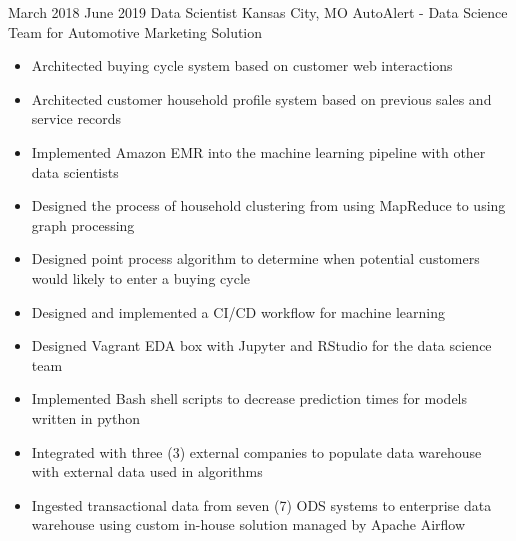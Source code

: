 \ProjectExperience
{March 2018}
{June 2019}
{Data Scientist}
{Kansas City, MO}
{AutoAlert - Data Science Team for Automotive Marketing Solution}
{
    \begin{itemize}
        \item Architected buying cycle system based on customer web interactions
        \item Architected customer household profile system based on previous
        sales and service records
        \item Implemented Amazon EMR into the machine learning pipeline with
        other data scientists
    \end{itemize}
}
{
    \begin{itemize}
        \item Designed the process of household clustering from using MapReduce
        to using graph processing
        \item Designed point process algorithm to determine when potential
        customers would likely to enter a buying cycle
        \item Designed and implemented a CI/CD workflow for machine learning
        \item Designed Vagrant EDA box with Jupyter and RStudio for the data
        science team
    \end{itemize}
}
{
    \begin{itemize}
        \item Implemented Bash shell scripts to decrease prediction times for
        models written in python
        \item Integrated with three (3) external companies to populate data
        warehouse with external data used in algorithms
        \item Ingested transactional data from seven (7) ODS systems to
        enterprise data warehouse using custom in-house solution managed by
        Apache Airflow
    \end{itemize}
}

\vspace*{0.1 in}

